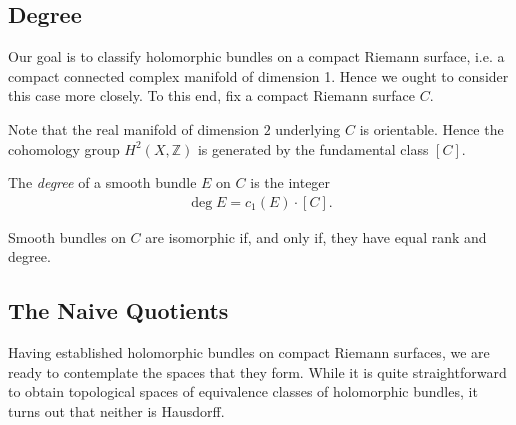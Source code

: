 \documentclass[12pt]{ociamthesis}  %
\begin{document}
\subsection{Degree}

Our goal is to classify holomorphic bundles on a compact Riemann surface,
i.e. a compact connected complex manifold of dimension 1. Hence we
ought to consider this case more closely. To this end, fix a compact
Riemann surface $C$.


Note that the real manifold of dimension $2$ underlying $C$ is orientable. \missingcitation
Hence the cohomology group $H^2(X,\mathbb{Z})$ is generated by the
fundamental class $[C]$.

\begin{definition}
  The \emph{degree} of a smooth bundle $E$ on $C$ is the integer
  \begin{align*}
    \deg E = c_1(E)\cdot[C].
  \end{align*}
\end{definition}

\begin{theorem}
  Smooth bundles on $C$ are isomorphic if, and only if, they have
  equal rank and degree.
\end{theorem}

\missingsection



\subsection{The Naive Quotients}

Having established holomorphic bundles on compact Riemann surfaces,
we are ready to contemplate the spaces that they form. While it is
quite straightforward to obtain topological spaces of equivalence
classes of holomorphic bundles, it turns out that neither is Hausdorff.
\end{document}
